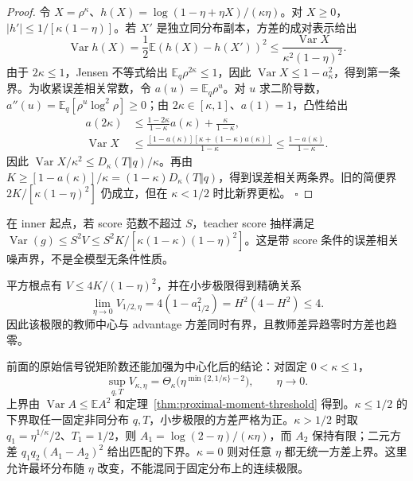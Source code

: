 \documentclass[lang=cn,scheme=chinese,openany]{../book/elegantbook}
\newcommand{\E}{\mathbb E}
\newcommand{\Var}{\operatorname{Var}}
\begin{document}
\begin{proof}
令 $X=\rho^\kappa$、$h(X)=\log(1-\eta+\eta X)/(\kappa\eta)$。对 $X\ge0$，$|h'|\le1/[\kappa(1-\eta)]$。若 $X'$ 是独立同分布副本，方差的成对表示给出
\begin{equation}
 \Var h(X)=\frac12\E(h(X)-h(X'))^2
 \le\frac{\Var X}{\kappa^2(1-\eta)^2}.
\end{equation}
由于 $2\kappa\le1$，Jensen 不等式给出 $\E_q\rho^{2\kappa}\le1$，因此 $\Var X\le1-a_\kappa^2$，得到第一条界。为收紧误差相关常数，令 $a(u)=\E_q\rho^u$。对 $u$ 求二阶导数，$a''(u)=\E_q[\rho^u\log^2\rho]\ge0$；由 $2\kappa\in[\kappa,1]$、$a(1)=1$，凸性给出
\begin{align}
 a(2\kappa)&\le\frac{1-2\kappa}{1-\kappa}a(\kappa)+\frac{\kappa}{1-\kappa},\\
 \Var X&\le\frac{[1-a(\kappa)][\kappa+(1-\kappa)a(\kappa)]}{1-\kappa}
 \le\frac{1-a(\kappa)}{1-\kappa}.
\end{align}
因此 $\Var X/\kappa^2\le D_\kappa(T\Vert q)/\kappa$。再由 $K\ge[1-a(\kappa)]/\kappa=(1-\kappa)D_\kappa(T\Vert q)$，得到误差相关两条界。旧的简便界 $2K/[\kappa(1-\eta)^2]$ 仍成立，但在 $\kappa<1/2$ 时比新界更松。
\hfill$\square$
\end{proof}

在 inner 起点，若 score 范数不超过 $S$，teacher score 抽样满足 $\Var(g)\le S^2V\le S^2K/[\kappa(1-\kappa)(1-\eta)^2]$。这是带 score 条件的误差相关噪声界，不是全模型无条件性质。

平方根点有 $V\le4K/(1-\eta)^2$，并在小步极限得到精确关系
\begin{equation}
 \lim_{\eta\to0}V_{1/2,\eta}
 =4(1-a_{1/2}^2)=H^2(4-H^2)\le4.
\end{equation}
因此该极限的教师中心与 advantage 方差同时有界，且教师差异趋零时方差也趋零。

前面的原始信号锐矩阶数还能加强为中心化后的结论：对固定 $0<\kappa\le1$，
\begin{equation}
 \sup_{q,T}V_{\kappa,\eta}
 =\Theta_\kappa\big(\eta^{\min\{2,1/\kappa\}-2}\big),\qquad\eta\to0.
\end{equation}
上界由 $\Var A\le\E A^2$ 和定理~\ref{thm:proximal-moment-threshold} 得到。$\kappa\le1/2$ 的下界取任一固定非同分布 $q,T$，小步极限的方差严格为正。$\kappa>1/2$ 时取 $q_1=\eta^{1/\kappa}/2$、$T_1=1/2$，则 $A_1=\log(2-\eta)/(\kappa\eta)$，而 $A_2$ 保持有限；二元方差 $q_1q_2(A_1-A_2)^2$ 给出匹配的下界。$\kappa=0$ 则对任意 $\eta$ 都无统一方差上界。这里允许最坏分布随 $\eta$ 改变，不能混同于固定分布上的连续极限。
\end{document}
